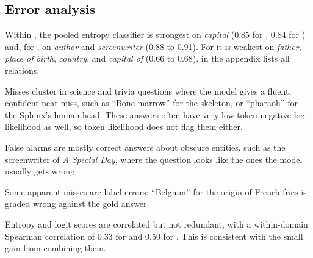\subsection{Error analysis}
\label{sec:errors}

Within \popqa, the pooled entropy classifier is strongest on \emph{capital} (0.85 for \qwen, 0.84 for \llama) and, for \qwen, on \emph{author} and \emph{screenwriter} (0.88 to 0.91).
For \qwen it is weakest on \emph{father}, \emph{place of birth}, \emph{country}, and \emph{capital of} (0.66 to 0.68).
 in the appendix lists all relations.

Misses cluster in science and trivia questions where the model gives a fluent, confident near-miss, such as ``Bone marrow'' for the skeleton, or ``pharaoh'' for the Sphinx's human head.
These answers often have very low token negative log-likelihood as well, so token likelihood does not flag them either.

False alarms are mostly correct answers about obscure \popqa entities, such as the screenwriter of \emph{A Special Day}, where the question looks like the ones the model usually gets wrong.

Some apparent misses are label errors: ``Belgium'' for the origin of French fries is graded wrong against the gold answer.

Entropy and logit scores are correlated but not redundant, with a within-domain Spearman correlation of 0.33 for \qwen and 0.50 for \llama.
This is consistent with the small gain from combining them.
